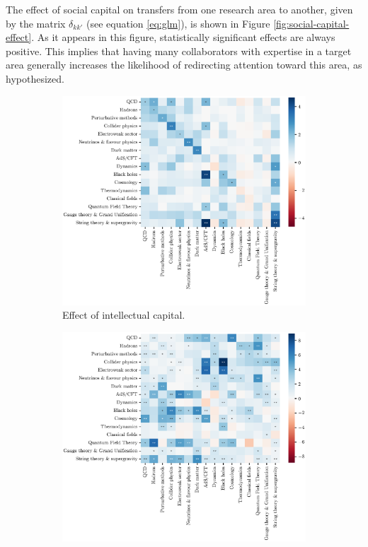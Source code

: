 \documentclass{article}
\begin{document}
The effect of social capital on transfers from one research area to another, given by the matrix $\delta_{kk'}$ (see equation \ref{eq:glm}), is shown in Figure \ref{fig:social-capital-effect}. As it appears in this figure, statistically significant effects are always positive. This implies that having many collaborators with expertise in a target area generally increases the likelihood of redirecting attention toward this area, as hypothesized. 


\begin{figure}[h]
\hspace{-2em}
\begin{subfigure}{.5\textwidth}
    \includegraphics[width=1\textwidth]{plots/ei_gamma_control_nu.eps}
    \caption{Effect of intellectual capital.}
    \label{fig:intellectual-capital-effect}
\end{subfigure}%
\begin{subfigure}{.5\textwidth}
    \includegraphics[width=1\textwidth]{plots/ei_delta_control_nu.eps}

\end{subfigure}
\end{figure}
\end{document}

